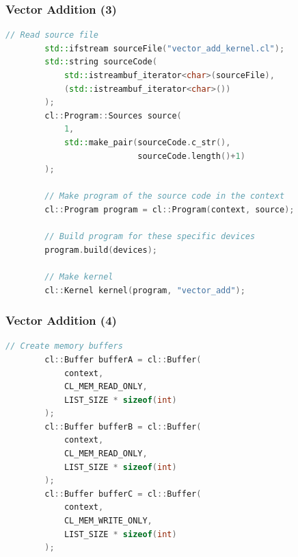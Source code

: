 \begin{frame}[fragile]
  \frametitle{Vector Addition (3)}



  \begin{lstlisting}[language=C++]
        // Read source file
        std::ifstream sourceFile("vector_add_kernel.cl");
        std::string sourceCode(
            std::istreambuf_iterator<char>(sourceFile),
            (std::istreambuf_iterator<char>())
        );
        cl::Program::Sources source(
            1,
            std::make_pair(sourceCode.c_str(),
                           sourceCode.length()+1)
        );
 
        // Make program of the source code in the context
        cl::Program program = cl::Program(context, source);
 
        // Build program for these specific devices
        program.build(devices);
 
        // Make kernel
        cl::Kernel kernel(program, "vector_add");
  \end{lstlisting}

\end{frame}

\begin{frame}[fragile]
  \frametitle{Vector Addition (4)}


  \begin{lstlisting}[language=C++]
        // Create memory buffers
        cl::Buffer bufferA = cl::Buffer(
            context,
            CL_MEM_READ_ONLY,
            LIST_SIZE * sizeof(int)
        );
        cl::Buffer bufferB = cl::Buffer(
            context,
            CL_MEM_READ_ONLY,
            LIST_SIZE * sizeof(int)
        );
        cl::Buffer bufferC = cl::Buffer(
            context,
            CL_MEM_WRITE_ONLY,
            LIST_SIZE * sizeof(int)
        );
  \end{lstlisting}


\end{frame}

